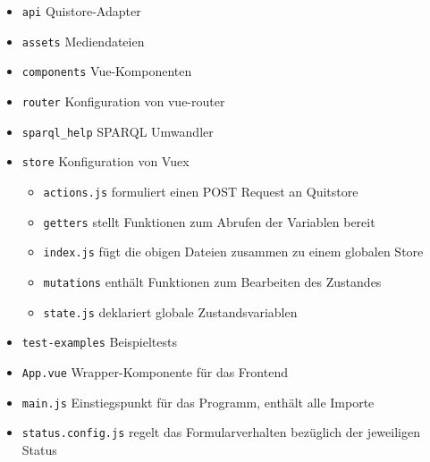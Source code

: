 \documentclass[a4paper,11pt,oneside, titlepage]{article}
\begin{document}
  \newpage


    \begin{itemize}
      \item \verb+api+ Quistore-Adapter
      \item \verb+assets+ Mediendateien
      \item \verb+components+ Vue-Komponenten
      \item \verb+router+ Konfiguration von vue-router
      \item \verb+sparql_help+ SPARQL Umwandler
      \item \verb+store+ Konfiguration von Vuex
        \begin{itemize}
          \item \verb+actions.js+ formuliert einen POST Request an Quitstore
          \item \verb+getters+ stellt Funktionen zum Abrufen der Variablen bereit
          \item \verb+index.js+ fügt die obigen Dateien zusammen zu einem globalen Store
          \item \verb+mutations+ enthält Funktionen zum Bearbeiten des Zustandes
          \item \verb+state.js+ deklariert globale Zustandsvariablen
        \end{itemize}
      \item \verb+test-examples+ Beispieltests
      \item \verb+App.vue+ Wrapper-Komponente für das Frontend
      \item \verb+main.js+ Einstiegspunkt für das Programm, enthält alle Importe
      \item \verb+status.config.js+ regelt das Formularverhalten bezüglich der jeweiligen Status
    \end{itemize}

\begin{minipage}{16cm}
\end{minipage}
\end{document}
